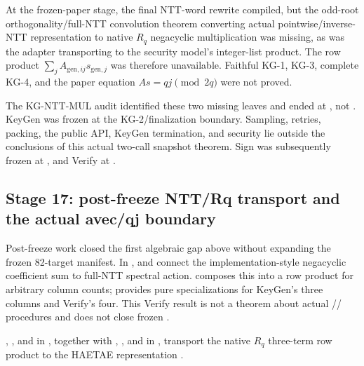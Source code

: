 \begin{openobligation}
At the frozen-paper stage, the final NTT-word rewrite compiled, but the
odd-root orthogonality/full-NTT convolution theorem converting actual
pointwise/inverse-NTT representation to native \(R_q\) negacyclic multiplication
was missing, as was the adapter transporting  to the
security model's integer-list product. The row product
\(\sum_j A_{\mathrm{gen},ij}s_{\mathrm{gen},j}\) was therefore unavailable.
Faithful KG-1, KG-3, complete KG-4, and the paper equation
\(A s=qj\pmod{2q}\) were not proved.
\end{openobligation}

The KG-NTT-MUL audit identified these two missing leaves and ended at
, not .
KeyGen was frozen at the KG-2/finalization boundary.
Sampling, retries, packing, the public API, KeyGen termination, and security
lie outside the conclusions of this actual two-call snapshot theorem.
Sign was subsequently frozen at , and
Verify at 
\cite{week16-sign-report,week16-verify-report,paper-freeze-artifacts}.

\subsection{Stage 17: post-freeze NTT/Rq transport and the actual avec/qj boundary}

Post-freeze work closed the first algebraic gap above without expanding the
frozen 82-target manifest.
In ,
 and
 connect the
implementation-style negacyclic coefficient sum to full-NTT spectral action.
 composes this into a row product
for arbitrary column counts; 
provides pure specializations for KeyGen's three columns and Verify's four.
This Verify result is not a theorem about actual
//
 procedures and does not close frozen
.

, , and
 in , together
with ,
, and
 in
, transport the native \(R_q\)
three-term row product to the HAETAE  representation
\cite{post-freeze-kg-rq-haetae-report}.

